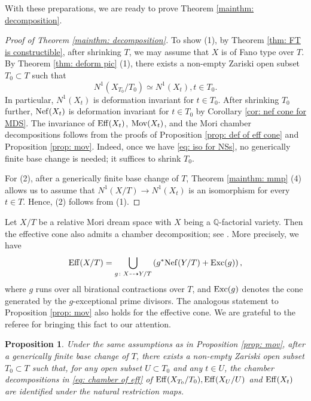 \documentclass[11pt,oneside,reqno]{amsart}
\numberwithin{equation}{section}
\newtheorem{proposition}{Proposition}[section]
\theoremstyle{definition}
\newcommand{\Exc}{{\rm {Exc}}}
\newcommand{\Nef}{{\rm {Nef}}}
\newcommand{\Eff}{{\rm {Eff}}}
\newcommand{\Mov}{{\rm {Mov}}}
\newcommand{\bQ}{\mathbb{Q}}
\begin{document}
With these preparations, we are ready to prove Theorem \ref{mainthm: decomposition}.

\begin{proof}[Proof of Theorem \ref{mainthm: decomposition}]
To show (1), by Theorem \ref{thm: FT is constructible}, after shrinking $T$,
we may assume that $X$ is of Fano type over $T$. By Theorem
\ref{thm: deform pic} (1), there exists a non-empty Zariski open subset
$T_0\subset T$ such that 
\begin{equation}\label{eq: iso for NSs}
N^1(X_{T_0}/T_0) \simeq N^1(X_t), t\in T_0.
\end{equation}
In particular, $N^1(X_t)$ is deformation invariant for
$t\in T_0$. After shrinking $T_0$ further, $\Nef(X_t)$ is deformation
invariant for $t\in T_0$ by Corollary \ref{cor: nef cone for MDS}. The invariance of $\Eff(X_t)$, $\Mov(X_t)$, and the Mori chamber
decompositions follows from the proofs of Proposition
\ref{prop: def of eff cone} and Proposition \ref{prop: mov}. Indeed, once
we have \eqref{eq: iso for NSs}, no generically finite base change is needed; it suffices to shrink $T_0$.

For (2), after a generically finite base change of $T$, Theorem
\ref{mainthm: mmp} (4) allows us to assume that
$N^1(X/T) \to N^1(X_t)$ is an isomorphism for every $t\in T$. Hence, (2) follows from (1).
\end{proof}


Let $X/T$ be a relative Mori dream space with $X$ being a $\bQ$-factorial variety. Then the effective cone also admits a chamber decomposition; see \cite[Proposition 1.11 (2)]{HK00}. More precisely, we have
\begin{equation}\label{eq: chamber of eff}
\Eff(X/T)
=
\bigcup_{g\colon X \dashrightarrow Y/T}
\left(g^*\Nef(Y/T) + \Exc(g)\right),
\end{equation}
where $g$ runs over all birational contractions over $T$, and $\Exc(g)$ denotes
the cone generated by the $g$-exceptional prime divisors. The analogous statement to Proposition \ref{prop: mov} also holds for the effective cone. We are grateful to the referee for bringing this fact to our
attention.

\begin{proposition}\label{prop: Mori chamber for Eff}
Under the same assumptions as in Proposition \ref{prop: mov}, after a
generically finite base change of $T$, there exists a non-empty Zariski open
subset $T_0\subset T$ such that, for any open subset $U\subset T_0$ and any
$t\in U$, the chamber decompositions in \eqref{eq: chamber of eff} of $
\Eff(X_{T_0}/T_0), \Eff(X_U/U)$ and $\Eff(X_t)$ are identified under the natural restriction maps.
\end{proposition}
\end{document}
